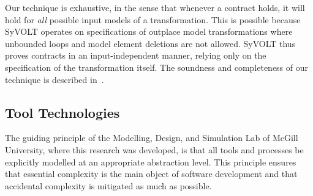Our technique is exhaustive, in the sense that whenever a contract holds, it
will hold for \emph{all} possible input models of a transformation. This is
possible because SyVOLT operates on specifications of outplace model transformations where unbounded loops and model element
deletions are not allowed. SyVOLT thus proves contracts in an input-independent
manner, relying only on the specification of the transformation itself. The
soundness and completeness of our technique is described in~\cite{Lucio2014}.


%
%
%


\subsection{Tool Technologies}


The guiding principle of the Modelling, Design, and Simulation Lab of McGill University, where this research was developed, is that all tools and processes be
explicitly modelled at an appropriate abstraction level. This principle ensures that essential complexity is the main object of software development and that accidental complexity is mitigated as much as possible.

